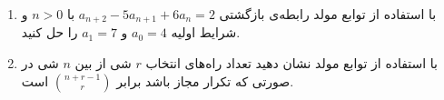     \p 
\begin{enumerate}
\item
با استفاده از توابع مولد رابطه‌ی بازگشتی
$a_{n+2} - 5a_{n+1} + 6a_n = 2$
با
$n > 0$
و شرایط اولیه
$a_0 = 4$
و
$a_1 = 7$
را حل کنید.
\item
با استفاده از توابع مولد نشان دهید تعداد راه‌های انتخاب
$r$
شی از بین
$n$
شی در صورتی که تکرار مجاز باشد برابر
$\binom{n+r-1}{r}$
است.
\end{enumerate}